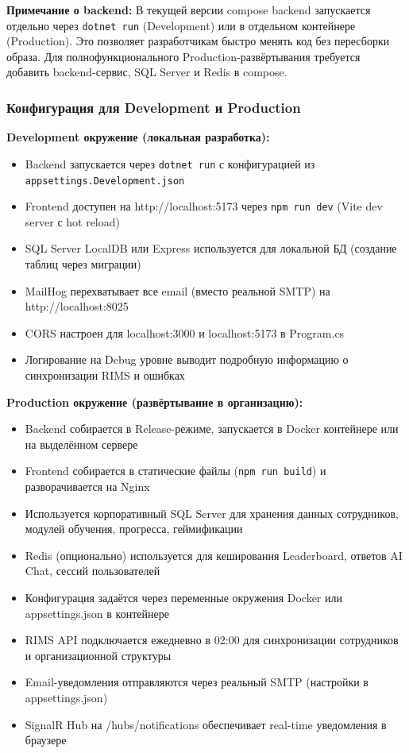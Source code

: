 \textbf{Примечание о backend:} В текущей версии compose backend запускается отдельно через \texttt{dotnet run} (Development) или в отдельном контейнере (Production). Это позволяет разработчикам быстро менять код без пересборки образа. Для полнофункционального Production-развёртывания требуется добавить backend-сервис, SQL Server и Redis в compose.

\subsubsection*{Конфигурация для Development и Production}

\textbf{Development окружение (локальная разработка):}

\begin{itemize}
	\item Backend запускается через \texttt{dotnet run} с конфигурацией из \texttt{appsettings.Development.json}
	\item Frontend доступен на http://localhost:5173 через \texttt{npm run dev} (Vite dev server с hot reload)
	\item SQL Server LocalDB или Express используется для локальной БД (создание таблиц через миграции)
	\item MailHog перехватывает все email (вместо реальной SMTP) на http://localhost:8025
	\item CORS настроен для localhost:3000 и localhost:5173 в Program.cs
	\item Логирование на Debug уровне выводит подробную информацию о синхронизации RIMS и ошибках
\end{itemize}

\textbf{Production окружение (развёртывание в организацию):}

\begin{itemize}
	\item Backend собирается в Release-режиме, запускается в Docker контейнере или на выделённом сервере
	\item Frontend собирается в статические файлы (\texttt{npm run build}) и разворачивается на Nginx
	\item Используется корпоративный SQL Server для хранения данных сотрудников, модулей обучения, прогресса, геймификации
	\item Redis (опционально) используется для кеширования Leaderboard, ответов AI Chat, сессий пользователей
	\item Конфигурация задаётся через переменные окружения Docker или appsettings.json в контейнере
	\item RIMS API подключается ежедневно в 02:00 для синхронизации сотрудников и организационной структуры
	\item Email-уведомления отправляются через реальный SMTP (настройки в appsettings.json)
	\item SignalR Hub на /hubs/notifications обеспечивает real-time уведомления в браузере
\end{itemize}

